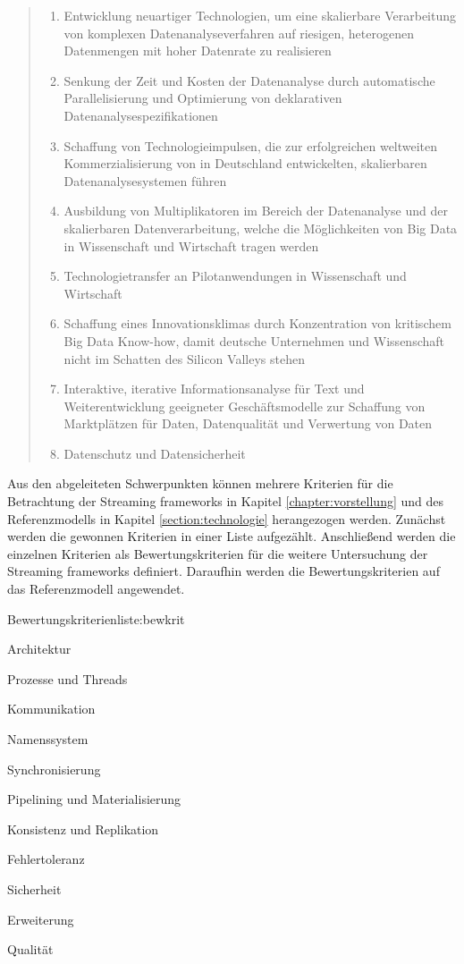 \begin{quote}
	\begin{enumerate}
		\item Entwicklung neuartiger Technologien, um eine skalierbare Verarbeitung von komplexen Datenanalyseverfahren auf riesigen, heterogenen Datenmengen mit hoher Datenrate zu realisieren
		\item Senkung der Zeit und Kosten der Datenanalyse durch automatische Parallelisierung und Optimierung von deklarativen Datenanalysespezifikationen
		\item Schaffung von Technologieimpulsen, die zur erfolgreichen weltweiten Kommerzialisierung von in Deutschland entwickelten, skalierbaren Datenanalysesystemen führen
		\item Ausbildung von Multiplikatoren im Bereich der Datenanalyse und der skalierbaren Datenverarbeitung, welche die Möglichkeiten von Big Data in Wissenschaft und Wirtschaft tragen werden
		\item Technologietransfer an Pilotanwendungen in Wissenschaft und Wirtschaft
		\item Schaffung eines Innovationsklimas durch Konzentration von kritischem Big Data Know-how, damit deutsche Unternehmen und Wissenschaft nicht im Schatten des Silicon Valleys stehen
		\item Interaktive, iterative Informationsanalyse für Text und Weiterentwicklung geeigneter Geschäftsmodelle zur Schaffung von Marktplätzen für Daten, Datenqualität und Verwertung von Daten
		\item Datenschutz und Datensicherheit
	\end{enumerate}
\end{quote}

Aus den abgeleiteten Schwerpunkten können mehrere Kriterien für die Betrachtung der Streaming frameworks in Kapitel \ref{chapter:vorstellung} und des Referenzmodells in Kapitel \ref{section:technologie} herangezogen werden. Zunächst werden die gewonnen Kriterien in einer Liste aufgezählt. Anschließend werden die einzelnen Kriterien als Bewertungskriterien für die weitere Untersuchung der Streaming frameworks definiert. Daraufhin werden die Bewertungskriterien auf das Referenzmodell angewendet.

\begin{itemlist}{Bewertungskriterien}{liste:bewkrit}
	\item Architektur
	\item Prozesse und Threads
	\item Kommunikation
	\item Namenssystem
	\item Synchronisierung
	\item Pipelining und Materialisierung
	\item Konsistenz und Replikation	
	\item Fehlertoleranz
	\item Sicherheit	
	\item Erweiterung
	\item Qualität
\end{itemlist}

